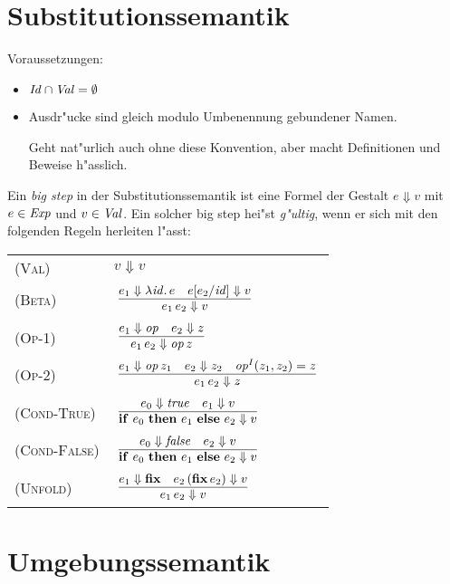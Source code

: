 \documentclass[12pt,fleqn]{article}
\newcommand{\RN}[1]{\mbox{\textsc{(#1)}}}
\begin{document}
\section{Substitutionssemantik}

Voraussetzungen:
\begin{itemize}
  \item ${\text{\it Id\/}} \cap {\text{\it Val\/}} = \emptyset$

  \item Ausdr"ucke sind gleich modulo Umbenennung gebundener Namen.

        Geht nat"urlich auch ohne diese Konvention, aber macht Definitionen und Beweise h"asslich.
\end{itemize}

\begin{definition}
Ein {\em big step} in der Substitutionssemantik ist eine Formel der Gestalt $e \Downarrow v$ mit $e\in{\text{\it Exp\/}}$
und $v \in {\text{\it Val\/}}$. Ein solcher big step hei"st {\em g"ultig}, wenn er sich mit den folgenden Regeln herleiten
l"asst: \\[5mm]
\begin{tabular}{ll}
  \RN{Val}        & $v \Downarrow v$ \\[3mm]
  \RN{Beta}       & $\regel{e_1 \Downarrow \abstr{\id}{e} \quad e[e_2/\id] \Downarrow v}
                           {\app{e_1}{e_2} \Downarrow v}$ \\[3mm]
  \RN{Op-1}       & $\regel{e_1 \Downarrow \op \quad e_2 \Downarrow z}
                           {\app{e_1}{e_2} \Downarrow \app{\op}{z}}$ \\[3mm]
  \RN{Op-2}       & $\regel{e_1 \Downarrow \app{\op}{z_1} \quad e_2 \Downarrow z_2 \quad \op^I(z_1,z_2) = z}
                           {\app{e_1}{e_2} \Downarrow z}$ \\[3mm]
  \RN{Cond-True}  & $\regel{e_0 \Downarrow \true \quad e_1 \Downarrow v}
                           {\bifte{e_0}{e_1}{e_2} \Downarrow v}$ \\[3mm]
  \RN{Cond-False} & $\regel{e_0 \Downarrow \false \quad e_2 \Downarrow v}
                           {\bifte{e_0}{e_1}{e_2} \Downarrow v}$ \\[3mm]
  \RN{Unfold}     & $\regel{e_1 \Downarrow \bfix \quad \app{e_2}{(\app{\bfix}{e_2})} \Downarrow v}
                           {\app{e_1}{e_2} \Downarrow v}$
\end{tabular}
\end{definition}


\section{Umgebungssemantik}
\end{document}
